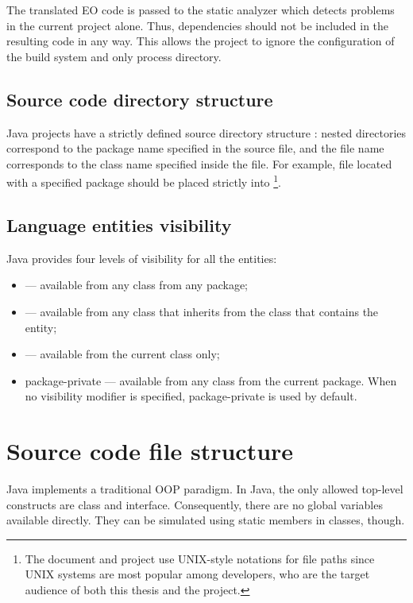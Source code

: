 The translated EO code is passed to the static analyzer which detects problems in the current project alone. Thus, dependencies should not be included in the resulting code in any way. This allows the project to ignore the configuration of the build system and only process  directory.


\subsection{Source code directory structure}

Java projects have a strictly defined source directory structure
\cite{java_specification}: nested directories correspond to the package name
specified in the source file, and the file name corresponds to the class name specified
inside the file. For example, file  located with a specified package
 should be placed strictly into
\footnote[2]{The document and project use UNIX-style notations for file paths since UNIX
systems are most popular among developers, who are the target audience of both
this thesis and the project.}.

\subsection{Language entities visibility}
\label{subsection:java_visibility}

Java provides four levels of visibility for all the entities:
\begin{itemize}
    \item {} --- available from any class from any package;
    \item {} --- available from any class that inherits from the
        class that contains the entity;
    \item {} --- available from the current class only;
    \item package-private --- available from any class from the current package.
        When no visibility modifier is specified, package-private is used by
        default.
\end{itemize}


\section{Source code file structure}

Java implements a traditional OOP paradigm. In Java, the only allowed top-level constructs are class and interface. Consequently, there are no global variables available directly. They can be simulated using static members in classes, though.

